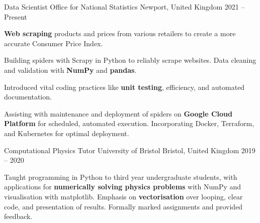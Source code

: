 
\begin{cventries}

    \cventry
        {Data Scientist} %
        {Office for National Statistics} %
        {Newport, United Kingdom} %
        {2021 -- Present} %
        {
            \begin{cvitems} %
                \item{\textbf{Web scraping} products and prices from various retailers to create a more accurate Consumer Price Index.}
                \item{Building spiders with Scrapy in Python to reliably scrape websites. Data cleaning and validation with \textbf{NumPy} and \textbf{pandas}.}
                \item{Introduced vital coding practices like \textbf{unit testing}, efficiency, and automated documentation.}
                \item{Assisting with maintenance and deployment of spiders on \textbf{Google Cloud Platform} for scheduled, automated execution. Incorporating Docker, Terraform, and Kubernetes for optimal deployment.}
            \end{cvitems}
        }

    \cventry
        {Computational Physics Tutor} %
        {University of Bristol} %
        {Bristol, United Kingdom} %
        {2019 -- 2020} %
        {
            \begin{cvitems} %
                \item{Taught programming in Python to third year undergraduate students, with applications for \textbf{numerically solving physics problems} with NumPy and visualisation with matplotlib. Emphasis on \textbf{vectorisation} over looping, clear code, and presentation of results. Formally marked assignments and provided feedback.}
            \end{cvitems}
        }


\end{cventries}
